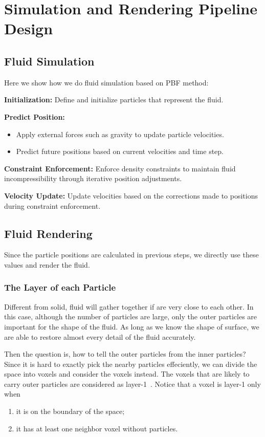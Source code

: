 \documentclass[sigconf]{acmart}
\begin{document}
\section{Simulation and Rendering Pipeline Design}

\subsection{Fluid Simulation}
\label{fluid-simulation}
Here we show how we do fluid simulation based on PBF method:

\textbf{Initialization:} Define and initialize particles that represent the fluid.

\textbf{Predict Position:}
\begin{itemize}
    \item Apply external forces such as gravity to update particle velocities.
    \item Predict future positions based on current velocities and time step.
\end{itemize}

\textbf{Constraint Enforcement:}
 Enforce density constraints to maintain fluid incompressibility through iterative position adjustments.

\textbf{Velocity Update:}
Update velocities based on the corrections made to positions during constraint enforcement.

\subsection{Fluid Rendering}
Since the particle positions are calculated in previous steps, we directly use these values and render the fluid.

\subsubsection{The Layer of each Particle}
Different from solid, fluid will gather together if are very close to each other. In this case, although the number of particles are large, only the outer particles are important for the shape of the fluid. As long as we know the shape of surface, we are able to restore almost every detail of the fluid accurately.

Then the question is, how to tell the outer particles from the inner particles? Since it is hard to exactly pick the nearby particles effeciently, we can divide the space into voxels and consider the voxels instead. The voxels that are likely to carry outer particles are considered as layer-1~\cite{oliveira2022narrow}. Notice that a voxel is layer-1 only when
\begin{enumerate}
\item it is on the boundary of the space;
\item it has at least one neighbor voxel without particles.
\end{enumerate}
\end{document}
